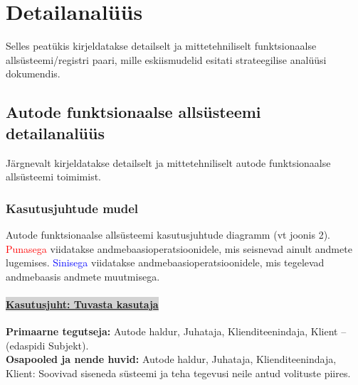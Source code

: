 \setlength{\topmargin}{-.5in}
\setlength{\textheight}{9in}
\setlength{\oddsidemargin}{.125in}
\setlength{\textwidth}{6.25in}
\captionsetup[table]{justification=justified,singlelinecheck=false,labelformat=empty,skip=0pt}
\graphicspath{ {./images/} }
\captionsetup[figure]{justification=justified,singlelinecheck=false,labelformat=empty,skip=0pt}

\chapter{Detailanalüüs}
Selles peatükis kirjeldatakse detailselt ja mittetehniliselt funktsionaalse allsüsteemi/registri paari, mille eskiismudelid esitati strateegilise analüüsi dokumendis.

\section{Autode funktsionaalse allsüsteemi detailanalüüs}
Järgnevalt kirjeldatakse detailselt ja mittetehniliselt autode funktsionaalse allsüsteemi toimimist.

\subsection{Kasutusjuhtude mudel}
Autode funktsionaalse allsüsteemi kasutusjuhtude diagramm (vt joonis 2).  \vspace{\pVert} \\ \hfill
\textcolor{red}{Punasega} viidatakse andmebaasioperatsioonidele, mis seisnevad ainult andmete lugemises. \textcolor{blue}{Sinisega} viidatakse andmebaasioperatsioonidele, mis tegelevad andmebaasis andmete muutmisega.

\begin{shaded}
	\subsubsection{\colorbox{lightgray}{\underline{Kasutusjuht: Tuvasta kasutaja}}}
	\textbf{Primaarne tegutseja:} Autode haldur, Juhataja, Klienditeenindaja, Klient – (edaspidi Subjekt). \\
	\textbf{Osapooled ja nende huvid:} Autode haldur, Juhataja, Klienditeenindaja, Klient: Soovivad siseneda süsteemi ja teha tegevusi neile antud volituste piires. \\
\end{shaded}